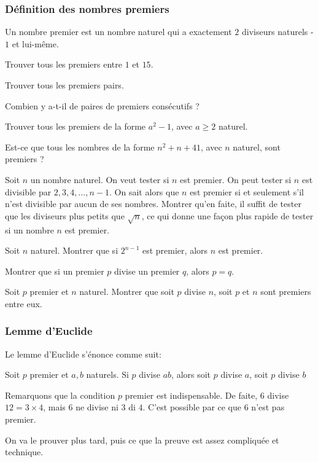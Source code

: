 \subsubsection{Définition des nombres premiers}
Un nombre premier est un nombre naturel qui a exactement \(2\) diviseurs naturels - \(1\) et lui-même.
\endgroup

\exo
Trouver tous les premiers entre \(1\) et \(15\).

\exo
Trouver tous les premiers pairs.

\exo
Combien y a-t-il de paires de premiers consécutifs ?

\exo
Trouver tous les premiers de la forme \(a^2 - 1\), avec \(a\geqslant2\) naturel.

\exo
Est-ce que tous les nombres de la forme \(n^2 + n + 41\), avec \(n\) naturel, sont premiers ?

\exo
Soit \(n\) un nombre naturel. On veut tester si \(n\) est premier.
On peut tester si \(n\) est divisible par \(2, 3, 4, \ldots, n-1\). On sait alors que \(n\) est premier si et seulement s’il n'est divisible par aucun de ses nombres. Montrer qu'en faite, il suffit de tester que les diviseurs plus petits que \(\sqrt{n}\), ce qui donne une façon plus rapide de tester si un nombre \(n\) est premier.

\exo
Soit \(n\) naturel. Montrer que si \(2^{n-1}\) est premier, alors \(n\) est premier.

\exo
Montrer que si un premier \(p\) divise un premier \(q\), alors \(p=q\).

\exo
Soit \(p\) premier et \(n\) naturel. Montrer que soit \(p\) divise \(n\), soit \(p\) et \(n\) sont premiers entre eux.

\subsubsection{Lemme d'Euclide}
Le lemme d'Euclide s'énonce comme suit:



Soit \(p\) premier et \(a, b\) naturels. Si \(p\) divise \(ab\), alors soit \(p\) divise \(a\), soit \(p\) divise \(b\)

\endgroup

Remarquons que la condition \(p\) premier est indispensable. De faite, \(6\) divise \(12 = 3 \times 4\), mais \(6\) ne divise ni \(3\) di \(4\). C'est possible par ce que \(6\) n'est pas premier.

On va le prouver plus tard, puis ce que la preuve est assez compliquée et technique.

